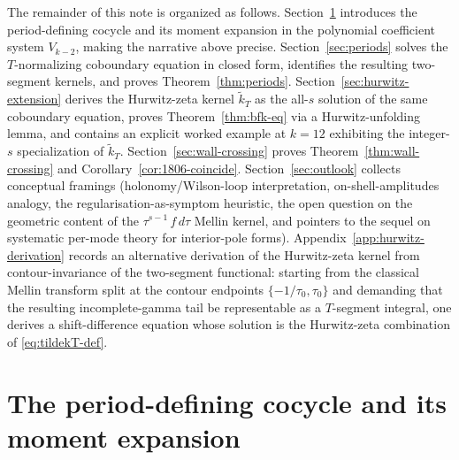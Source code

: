\documentclass[11pt]{article}
\numberwithin{equation}{section}  %
\begin{document}
The remainder of this note is organized as follows.
Section~\ref{sec:cocycle} introduces the period-defining cocycle and its
moment expansion in the polynomial coefficient system $V_{k-2}$, making
the narrative above precise.  Section~\ref{sec:periods} solves the
$T$-normalizing coboundary equation in closed form, identifies
the resulting two-segment kernels, and proves Theorem~\ref{thm:periods}.
Section~\ref{sec:hurwitz-extension} derives the Hurwitz-zeta kernel
$\widetilde{k}_T$ as the all-$s$ solution of the same coboundary
equation, proves Theorem~\ref{thm:bfk-eq} via a Hurwitz-unfolding lemma,
and contains an explicit worked example at $k = 12$ exhibiting the
integer-$s$ specialization of $\widetilde{k}_T$.  Section~\ref{sec:wall-crossing} proves
Theorem~\ref{thm:wall-crossing} and Corollary~\ref{cor:1806-coincide}.
Section~\ref{sec:outlook} collects conceptual framings
(holonomy/Wilson-loop interpretation, on-shell-amplitudes analogy, the
regularisation-as-symptom heuristic, the open question on the geometric
content of the $\tau^{s-1}\,f\,d\tau$ Mellin kernel, and pointers to the
sequel on systematic per-mode theory for interior-pole forms).
Appendix~\ref{app:hurwitz-derivation} records an alternative derivation
of the Hurwitz-zeta kernel from contour-invariance of the two-segment
functional: starting from the classical Mellin transform split at the
contour endpoints $\{-1/\tau_0, \tau_0\}$ and demanding that the
resulting incomplete-gamma tail be representable as a $T$-segment
integral, one derives a shift-difference equation whose solution is the
Hurwitz-zeta combination of \eqref{eq:tildekT-def}.


\section{The period-defining cocycle and its moment expansion}\label{sec:cocycle}
\end{document}
